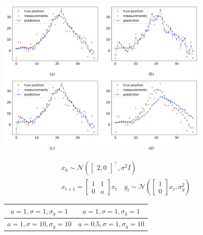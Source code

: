 \documentclass[landscape,a0paper,fontscale=0.285]{baposter} %
\begin{document}
\begin{poster}
{\begin{center}
    \includegraphics[width=0.8\textwidth,trim={0cm 3cm 0 2cm},clip]{figures/czu87jWDYg1FQRy.png}
\end{center}
$$
\begin{aligned}
x_0\sim \mathcal N(\left[\begin{smallmatrix}
2,0
\end{smallmatrix}\right]^\top,\sigma^2 I) 
\\
x_{t+1} = 
\left[\begin{smallmatrix}
1 & 1 \\ 0 & a
\end{smallmatrix}\right]x_t
\quad
y_t\sim  \mathcal N (\left[\begin{smallmatrix}
    1 \\ 0 
\end{smallmatrix}\right] x_t, \sigma_y^2)
\end{aligned}
$$

\begin{tabular}{c|c}
    $a=1, \sigma=1, \sigma_y=1$& $a=1,\sigma=1,\sigma_y=1$ \\\hline
    $a=1, \sigma=10, \sigma_y=10$ & $a=0.5,\sigma=1,\sigma_y=10$ \\
\end{tabular}


}


\end{poster}
\end{document}
